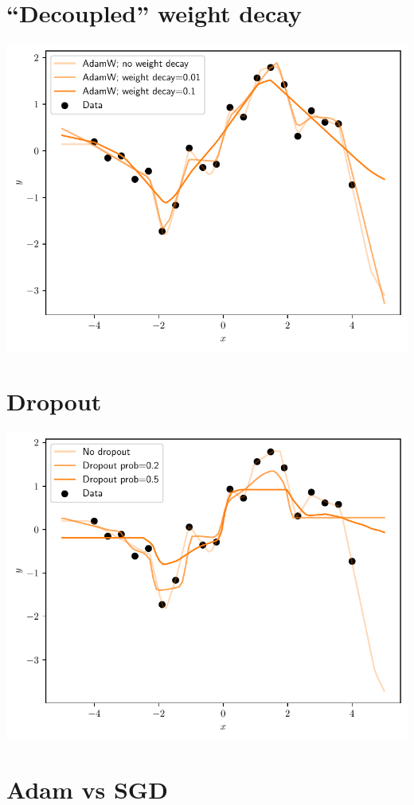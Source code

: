 \documentclass{article}
\newcommand{\0}{\mathbf{0}}
\begin{document}
\newpage
\section{``Decoupled'' weight decay}
\includegraphics[width=\textwidth]{decoupled_weight_decay.pdf}

\newpage
\section{Dropout}
\includegraphics[width=\textwidth]{dropout.pdf}

\newpage
\section{Adam vs SGD}
\end{document}
